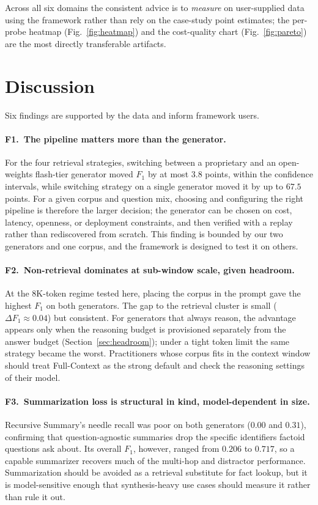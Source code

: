 \documentclass[conference,a4paper,10pt]{IEEEtran}
\begin{document}
Across all six domains the consistent advice is to \emph{measure} on user-supplied data using the framework rather than rely on the case-study point estimates; the per-probe heatmap (Fig.~\ref{fig:heatmap}) and the cost-quality chart (Fig.~\ref{fig:pareto}) are the most directly transferable artifacts.

\section{Discussion}
\label{sec:discussion}

Six findings are supported by the data and inform framework users.

\paragraph{F1.~The pipeline matters more than the generator.}
For the four retrieval strategies, switching between a proprietary and an open-weights flash-tier generator moved $F_1$ by at most $3.8$ points, within the confidence intervals, while switching strategy on a single generator moved it by up to $67.5$ points.
For a given corpus and question mix, choosing and configuring the right pipeline is therefore the larger decision; the generator can be chosen on cost, latency, openness, or deployment constraints, and then verified with a replay rather than rediscovered from scratch.
This finding is bounded by our two generators and one corpus, and the framework is designed to test it on others.

\paragraph{F2.~Non-retrieval dominates at sub-window scale, given headroom.}
At the 8K-token regime tested here, placing the corpus in the prompt gave the highest $F_1$ on both generators.
The gap to the retrieval cluster is small ($\Delta F_1 \approx 0.04$) but consistent.
For generators that always reason, the advantage appears only when the reasoning budget is provisioned separately from the answer budget (Section~\ref{sec:headroom}); under a tight token limit the same strategy became the worst.
Practitioners whose corpus fits in the context window should treat Full-Context as the strong default and check the reasoning settings of their model.

\paragraph{F3.~Summarization loss is structural in kind, model-dependent in size.}
Recursive Summary's needle recall was poor on both generators ($0.00$ and $0.31$), confirming that question-agnostic summaries drop the specific identifiers factoid questions ask about.
Its overall $F_1$, however, ranged from $0.206$ to $0.717$, so a capable summarizer recovers much of the multi-hop and distractor performance.
Summarization should be avoided as a retrieval substitute for fact lookup, but it is model-sensitive enough that synthesis-heavy use cases should measure it rather than rule it out.
\end{document}
